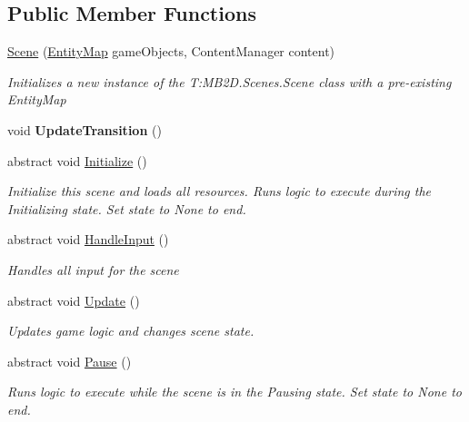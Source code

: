 \subsection*{Public Member Functions}
\begin{DoxyCompactItemize}
\item 
\hyperlink{class_m_b2_d_1_1_scenes_1_1_scene_ac9cb0c45a98614e7e4c1307ebb6ef85e}{Scene} (\hyperlink{class_m_b2_d_1_1_entity_component_1_1_entity_map}{Entity\+Map} game\+Objects, Content\+Manager content)
\begin{DoxyCompactList}\small\item\em Initializes a new instance of the T\+:\+M\+B2\+D.\+Scenes.\+Scene class with a pre-\/existing Entity\+Map \end{DoxyCompactList}\item 
\hypertarget{class_m_b2_d_1_1_scenes_1_1_scene_a3ac6e2ba061fc1ee7068921913de19fe}{}\label{class_m_b2_d_1_1_scenes_1_1_scene_a3ac6e2ba061fc1ee7068921913de19fe} 
void {\bfseries Update\+Transition} ()
\item 
abstract void \hyperlink{class_m_b2_d_1_1_scenes_1_1_scene_a081b4f8866936b495bdce388a7c96c25}{Initialize} ()
\begin{DoxyCompactList}\small\item\em Initialize this scene and loads all resources. Runs logic to execute during the Initializing state. Set state to None to end. \end{DoxyCompactList}\item 
abstract void \hyperlink{class_m_b2_d_1_1_scenes_1_1_scene_a476de5a885408d27ff151044d20738c8}{Handle\+Input} ()
\begin{DoxyCompactList}\small\item\em Handles all input for the scene \end{DoxyCompactList}\item 
abstract void \hyperlink{class_m_b2_d_1_1_scenes_1_1_scene_a779de7c1ab23b698dcde3a228324a991}{Update} ()
\begin{DoxyCompactList}\small\item\em Updates game logic and changes scene state. \end{DoxyCompactList}\item 
abstract void \hyperlink{class_m_b2_d_1_1_scenes_1_1_scene_a0661eff0223150fa8e9ea88145409e5d}{Pause} ()
\begin{DoxyCompactList}\small\item\em Runs logic to execute while the scene is in the Pausing state. Set state to None to end. \end{DoxyCompactList}\item 

\end{DoxyCompactItemize}
